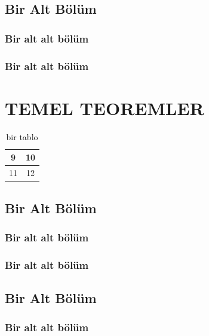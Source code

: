 \documentclass[
oneside, %
doktora, %
]{aufbetez} %
\begin{document}
\section{Bir Alt Bölüm}
\lipsum

\subsection{Bir alt alt bölüm}
\lipsum

\subsection{Bir alt alt bölüm}
\lipsum

\chapter{TEMEL TEOREMLER}
\lipsum
\begin{table}[htbp]
	\begin{center}
		\begin{tabular}{|c|c|}
			\hline 
			9 & 10 \\ 
			\hline 
			11 & 12 \\ 
			\hline 
		\end{tabular}
	\end{center}
	\caption{bir tablo\label{tablo-3}}
\end{table}

\section{Bir Alt Bölüm}
\lipsum

\subsection{Bir alt alt bölüm}
\lipsum

\subsection{Bir alt alt bölüm}
\lipsum

\section{Bir Alt Bölüm}
\lipsum

\subsection{Bir alt alt bölüm}
\lipsum
\end{document}
